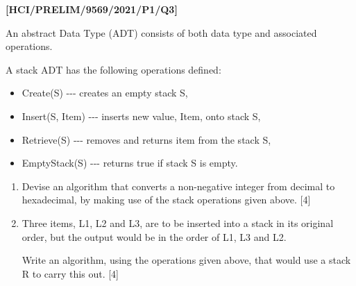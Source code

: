 \item \textbf{{[}HCI/PRELIM/9569/2021/P1/Q3{]}}

An abstract Data Type (ADT) consists of both data type and associated
operations. 

A stack ADT has the following operations defined: 
\begin{itemize}
\item Create(S) -{}-{}- creates an empty stack S, 
\item Insert(S, Item) -{}-{}- inserts new value, Item, onto stack S, 
\item Retrieve(S) -{}-{}- removes and returns item from the stack S, 
\item EmptyStack(S) -{}-{}- returns true if stack S is empty. 
\end{itemize}
\begin{enumerate}
\item Devise an algorithm that converts a non-negative integer from decimal
to hexadecimal, by making use of the stack operations given above.
\hfill{}{[}4{]}
\item Three items, L1, L2 and L3, are to be inserted into a stack in its
original order, but the output would be in the order of L1, L3 and
L2. 

Write an algorithm, using the operations given above, that would use
a stack R to carry this out. \hfill{}{[}4{]}
\end{enumerate}